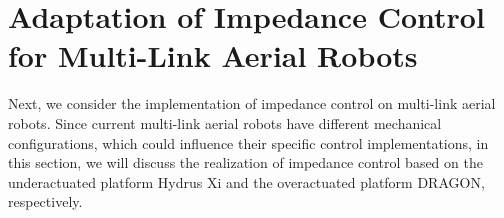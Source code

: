







\section{Adaptation of Impedance Control for Multi-Link Aerial Robots}
Next, we consider the implementation of impedance control on multi-link aerial robots. Since current multi-link aerial robots have different mechanical configurations, which could influence their specific control implementations, in this section, we will discuss the realization of impedance control based on the underactuated platform Hydrus Xi and the overactuated platform DRAGON, respectively.




